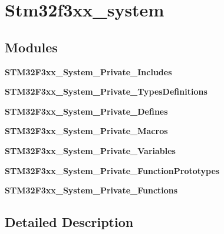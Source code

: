 \section{Stm32f3xx\+\_\+system}
\label{group__stm32f3xx__system}
\subsection*{Modules}
\begin{DoxyCompactItemize}
\item 
\textbf{ S\+T\+M32\+F3xx\+\_\+\+System\+\_\+\+Private\+\_\+\+Includes}
\item 
\textbf{ S\+T\+M32\+F3xx\+\_\+\+System\+\_\+\+Private\+\_\+\+Types\+Definitions}
\item 
\textbf{ S\+T\+M32\+F3xx\+\_\+\+System\+\_\+\+Private\+\_\+\+Defines}
\item 
\textbf{ S\+T\+M32\+F3xx\+\_\+\+System\+\_\+\+Private\+\_\+\+Macros}
\item 
\textbf{ S\+T\+M32\+F3xx\+\_\+\+System\+\_\+\+Private\+\_\+\+Variables}
\item 
\textbf{ S\+T\+M32\+F3xx\+\_\+\+System\+\_\+\+Private\+\_\+\+Function\+Prototypes}
\item 
\textbf{ S\+T\+M32\+F3xx\+\_\+\+System\+\_\+\+Private\+\_\+\+Functions}
\end{DoxyCompactItemize}


\subsection{Detailed Description}
